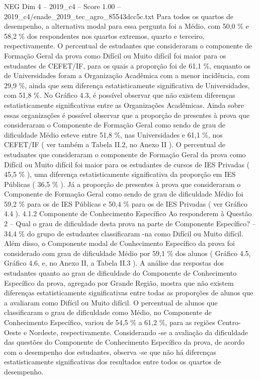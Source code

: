 \begin{textsample}{NEG Dim 4 – 2019\_c4 – Score 1.00 – 2019\_c4/enade\_2019\_tec\_agro\_85543dcc5c.txt}
Para todos os quartos de desempenho, a alternativa modal para essa pergunta foi a Médio, com 50,0 \% e 58,2 \% dos respondentes nos quartos extremos, quarto e terceiro, respectivamente.
O percentual de estudantes que consideraram o componente de Formação Geral da prova como Difícil ou Muito difícil foi maior para os estudantes de CEFET/IF, para os quais a proporção foi de 61,1 \%, enquanto os de Universidades foram a Organização Acadêmica com a menor incidência, com 29,9 \%, ainda que sem diferença estatisticamente significativa de Universidades, com 51,8 \%.
No Gráfico 4.3, é possível observar que não existem diferenças estatisticamente significativas entre as Organizações Acadêmicas.
Ainda sobre essas organizações é possível observar que a proporção de presentes à prova que consideraram o Componente de Formação Geral como sendo de grau de dificuldade Médio esteve entre 51,8 \%, nas Universidades e 61,1 \%, nos CEFET/IF ( ver também a Tabela II.2, no Anexo II ).
O percentual de estudantes que consideraram o componente de Formação Geral da prova como Difícil ou Muito difícil foi maior para os estudantes de cursos de IES Privadas ( 45,5 \% ), uma diferença estatisticamente significativa da proporção em IES Públicas ( 36,5 \% ).
Já a proporção de presentes à prova que consideraram o Componente de Formação Geral como sendo de grau de dificuldade Médio foi 59,2 \% para os de IES Públicas e 50,4 \% para os de IES Privadas ( ver Gráfico 4.4 ). 4.1.2 Componente de Conhecimento Específico Ao responderem à Questão 2 – Qual o grau de dificuldade desta prova na parte de Componente Específico? – 34,4 \% do grupo de estudantes classificaram -na como Difícil ou Muito difícil.
Além disso, o Componente modal de Conhecimento Específico da prova foi considerado com grau de dificuldade Médio por 59,1 \% dos alunos ( Gráfico 4.5, Gráfico 4.6, e, no Anexo II, a Tabela II.3 ).
A análise das respostas dos estudantes quanto ao grau de dificuldade do Componente de Conhecimento Específico da prova, agregado por Grande Região, mostra que não existem diferenças estatisticamente significativas entre todas as proporções de alunos que a avaliaram como Difícil ou Muito difícil.
O percentual de alunos que classificaram o grau de dificuldade como Médio, no Componente de Conhecimento Específico, variou de 54,5 \% a 61,2 \%, para as regiões Centro-Oeste e Nordeste, respectivamente.
Considerando -se a avaliação da dificuldade das questões do Componente de Conhecimento Específico da prova, de acordo com o desempenho dos estudantes, observa -se que não há diferenças estatisticamente significativas dos resultados entre todos os quartos de desempenho.

\end{textsample}
